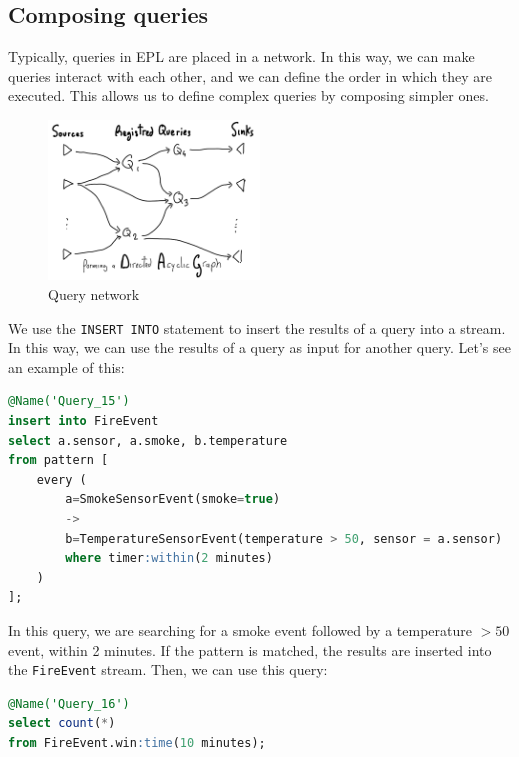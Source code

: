 \subsection{Composing queries}

Typically, queries in EPL are placed in a network. In this way, we can make 
queries interact with each other, and we can define the order in which they are
executed. This allows us to define complex queries by composing simpler ones.\\

\begin{figure}[H]
    \centering
    \includegraphics[width=0.5\textwidth]{figures/image_composite_queries.png}
    \caption{Query network}
    \label{fig:query_network}
\end{figure}

We use the \texttt{INSERT INTO} statement to insert the results of a query
into a stream. In this way, we can use the results of a query as input for
another query. Let's see an example of this:\\

\begin{lstlisting}[language=SQL]
@Name('Query_15')
insert into FireEvent
select a.sensor, a.smoke, b.temperature
from pattern [
    every (
        a=SmokeSensorEvent(smoke=true) 
        ->
        b=TemperatureSensorEvent(temperature > 50, sensor = a.sensor)
        where timer:within(2 minutes)
    )
];
\end{lstlisting}

In this query, we are searching for a smoke event followed by a temperature $> 50$
event, within 2 minutes. If the pattern is matched, the results are inserted into
the \texttt{FireEvent} stream. Then, we can use this query:\\

\begin{lstlisting}[language=SQL]
@Name('Query_16')
select count(*)
from FireEvent.win:time(10 minutes);
\end{lstlisting}

